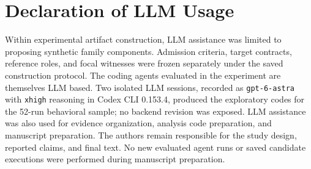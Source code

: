 \section*{Declaration of LLM Usage}
Within experimental artifact construction, LLM assistance was limited to proposing synthetic family components. Admission criteria, target contracts, reference roles, and focal witnesses were frozen separately under the saved construction protocol. The coding agents evaluated in the experiment are themselves LLM based. Two isolated LLM sessions, recorded as \texttt{gpt-6-astra} with \texttt{xhigh} reasoning in Codex CLI 0.153.4, produced the exploratory codes for the 52-run behavioral sample; no backend revision was exposed. LLM assistance was also used for evidence organization, analysis code preparation, and manuscript preparation. The authors remain responsible for the study design, reported claims, and final text. No new evaluated agent runs or saved candidate executions were performed during manuscript preparation.
